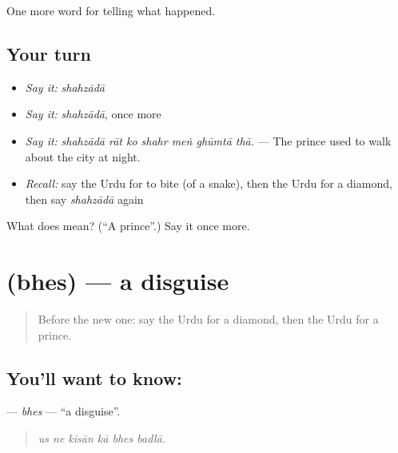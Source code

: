 \begin{grammarlens}[title={What you've built}]
One more word for telling what happened.
\end{grammarlens}

\subsection*{Your turn}
\begin{itemize}
\raggedright
  \item \emph{Say it:} \emph{shahzādā}
  \item \emph{Say it:} \emph{shahzādā}, once more
  \item \emph{Say it:} \emph{shahzādā rāt ko shahr meṅ ghūmtā thā.} — The prince used to walk about the city at night.
  \item \emph{Recall:} say the Urdu for to bite (of a snake), then the Urdu for a diamond, then say \emph{shahzādā} again
\end{itemize}

\begin{tcolorbox}[breakable,colback=teal!4,colframe=teal!35!black,title={Before you move on}]
What does  mean? (\textquotedblleft{}A prince\textquotedblright{}.) Say it once more.
\end{tcolorbox}
\section[\texorpdfstring{\ur{بھیس} (bhes)}{بھیس (bhes)}]{ (bhes) — a disguise}

\label{lesson:UR-C328-bhes}



\begin{quote}
Before the new one: say the Urdu for a diamond, then the Urdu for a prince.
\end{quote}

\subsection*{You'll want to know: }
\textbf{} — \emph{bhes} — \textquotedblleft{}a disguise\textquotedblright{}.

\begin{quote}
     
\end{quote}

\begin{quote}
\emph{us ne kisān kā bhes badlā.}
\end{quote}


